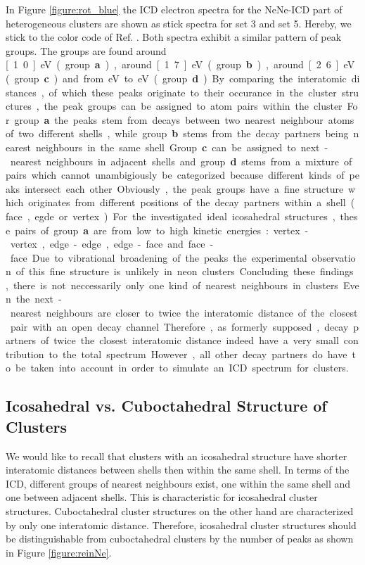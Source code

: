 In Figure \ref{figure:rot_blue} the ICD electron spectra for the NeNe-ICD
part of heterogeneous clusters are shown as stick spectra
for set 3 and set 5. Hereby, we stick to the color code of
Ref. \cite{Fasshauer14_1}. Both spectra exhibit a similar pattern of peak groups.
The groups are found around \unit[1.0]{eV} (group \textbf{a}),
around \unit[1.7]{eV} (group \textbf{b}), around \unit[2.6]{eV} (group \textbf{c})
and from \unit[3]{eV} to \unit[4]{eV} (group \textbf{d}). By comparing
the interatomic distances, of which these peaks originate to their occurance
in the cluster structures, the peak groups can be assigned to atom pairs
within the cluster. For group \textbf{a} the peaks stem from decays
between two nearest neighbour atoms of two different shells, while group \textbf{b}
stems from the decay partners being nearest neighbours in the same shell.
Group \textbf{c} can be assigned to next-nearest neighbours in adjacent shells
and group \textbf{d} stems from a mixture of pairs which cannot unambigiously
be categorized because different kinds of peaks intersect each other.

Obviously, the peak groups have a fine structure which originates from
different positions of the decay partners within a shell (face, egde or vertex).
For the investigated ideal icosahedral structures, these pairs of group \textbf{a}
are from low to high kinetic energies: vertex-vertex, edge-edge, edge-face and
face-face. Due to vibrational broadening of the peaks the experimental observation
of this fine structure is unlikely in neon clusters.

Concluding these findings, there is not neccessarily only one kind of nearest
neighbours in clusters. Even the next-nearest neighbours are closer to
twice the interatomic distance of the closest pair with an open decay channel.
Therefore, as formerly supposed, decay partners of twice the closest interatomic
distance indeed have a very small contribution to the total spectrum. However,
all other decay partners do have to be taken into account in order to simulate
an ICD spectrum for clusters.


\subsection{Icosahedral vs. Cuboctahedral Structure of Clusters}
\label{sec:icofcc}
We would like to recall that clusters with an icosahedral structure
have shorter interatomic distances between shells then within the same
shell.
In terms of the ICD, different groups of nearest neighbours exist,
one within the same shell and one
between adjacent shells. This is characteristic for icosahedral cluster structures.
Cuboctahedral cluster structures on the other hand are characterized by only
one interatomic distance. 
Therefore, icosahedral cluster structures should be distinguishable from
cuboctahedral clusters by the number of peaks as shown in Figure
\ref{figure:reinNe}.

